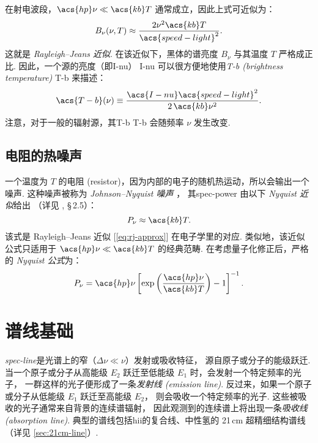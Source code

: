 在射电波段，$\acs{hp}\nu \ll \acs{kb}T$ 通常成立，因此上式可近似为：
\begin{equation}
  \label{eq:rj-approx}
  B_{\nu}(\nu, T)
    \approx \frac{2 \nu^2 \acs{kb} T}{\acs{speed-light}^2} .
\end{equation}
这就是 \emph{Rayleigh--Jeans 近似}.
在该近似下，黑体的谱亮度 $B_{\nu}$ 与其温度 $T$ 严格成正比.
因此，一个源的亮度（即\acl{I-nu}） \ac{I-nu}
可以很方便地使用\emph{\acl{T-b} (brightness temperature)} \ac{T-b} 来描述：
\begin{equation}
  \label{eq:Tb}
  \acs{T-b}(\nu)
    \equiv \frac{\acs{I-nu} \acs{speed-light}^2}{2 \,\acs{kb} \nu^2} .
\end{equation}
注意，对于一般的辐射源，其\acl{T-b} \ac{T-b} 会随频率 $\nu$ 发生改变.

\subsection{电阻的热噪声}

一个温度为 $T$ 的电阻 (resistor)，因为内部的电子的随机热运动，所以会输出一个噪声.
这种噪声被称为 \emph{Johnson--Nyquist 噪声} \cite{johnson1928,nyquist1928}，
其\ac{spec-power} 由以下 \emph{Nyquist 近似}给出
（详见 , \S\,2.5）：
\begin{equation}
  \label{eq:nyquist-approx}
  P_{\nu} \approx \acs{kb} T .
\end{equation}
该式是 Rayleigh--Jeans 近似 [\autoref{eq:rj-approx}] 在电子学里的对应.
类似地，该近似公式只适用于 $\acs{hp}\nu \ll \acs{kb}T$ 的经典范畴.
在考虑量子化修正后，严格的 \emph{Nyquist 公式}为：
\begin{equation}
  \label{eq:nyquist}
  P_{\nu} = \acs{hp} \nu
    \left[ \exp\left( \frac{\acs{hp} \nu}{\acs{kb} T} \right) - 1 \right]^{-1} .
\end{equation}


\section{谱线基础}
\label{sec:spectral-line}

\emph{\acf{spec-line}}是光谱上的窄（$\Delta\nu \ll \nu$）发射或吸收特征，
源自原子或分子的能级跃迁.
当一个原子或分子从高能级 $E_2$ 跃迁至低能级 $E_1$ 时，会发射一个特定频率的光子，
一群这样的光子便形成了一条\emph{发射线 (emission line)}.
反过来，如果一个原子或分子从低能级 $E_1$ 跃迁至高能级 $E_2$，
则会吸收一个特定频率的光子.
这些被吸收的光子通常来自背景的连续谱辐射，
因此观测到的连续谱上将出现一条\emph{吸收线 (absorption line)}.
典型的谱线包括\ac{hii}的复合线、中性氢的 21\,cm 超精细结构谱线
（详见 \autoref{sec:21cm-line}）.

